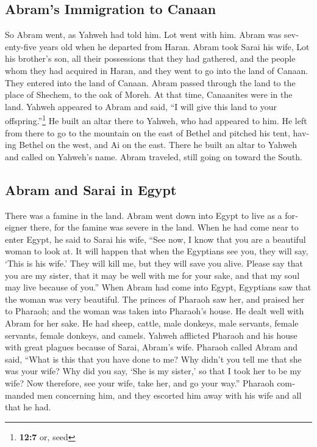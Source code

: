 \begin{paracol}{2}
\begin{otherlanguage}{english}
\hypertarget{abrams-immigration-to-canaan}{%
\subsection{Abram's Immigration to
Canaan}\label{abrams-immigration-to-canaan}}

 So Abram went, as Yahweh had told him. Lot went with him.
Abram was seventy-five years old when he departed from Haran.
 Abram took Sarai his wife, Lot his brother's son, all
their possessions that they had gathered, and the people whom they had
acquired in Haran, and they went to go into the land of Canaan. They
entered into the land of Canaan.  Abram passed through the
land to the place of Shechem, to the oak of Moreh. At that time,
Canaanites were in the land.  Yahweh appeared to Abram and
said, ``I will give this land to your offspring.''\footnote{\textbf{12:7}
  or, seed} He built an altar there to Yahweh, who had appeared to him.
 He left from there to go to the mountain on the east of
Bethel and pitched his tent, having Bethel on the west, and Ai on the
east. There he built an altar to Yahweh and called on Yahweh's name.
 Abram traveled, still going on toward the South.

\hypertarget{abram-and-sarai-in-egypt}{%
\subsection{Abram and Sarai in Egypt}\label{abram-and-sarai-in-egypt}}

 There was a famine in the land. Abram went down into
Egypt to live as a foreigner there, for the famine was severe in the
land.  When he had come near to enter Egypt, he said to
Sarai his wife, ``See now, I know that you are a beautiful woman to look
at.  It will happen that when the Egyptians see you, they
will say, `This is his wife.' They will kill me, but they will save you
alive.  Please say that you are my sister, that it may be
well with me for your sake, and that my soul may live because of you.''
 When Abram had come into Egypt, Egyptians saw that the
woman was very beautiful.  The princes of Pharaoh saw
her, and praised her to Pharaoh; and the woman was taken into Pharaoh's
house.  He dealt well with Abram for her sake. He had
sheep, cattle, male donkeys, male servants, female servants, female
donkeys, and camels.  Yahweh afflicted Pharaoh and his
house with great plagues because of Sarai, Abram's wife. 
Pharaoh called Abram and said, ``What is this that you have done to me?
Why didn't you tell me that she was your wife?  Why did
you say, `She is my sister,' so that I took her to be my wife? Now
therefore, see your wife, take her, and go your way.'' 
Pharaoh commanded men concerning him, and they escorted him away with
his wife and all that he had.


\end{otherlanguage}
\end{paracol}
